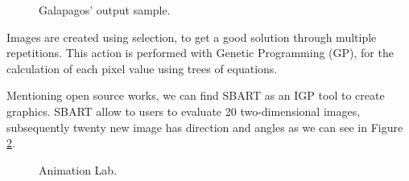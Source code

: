 \begin{figure}
\captionsetup{justification=centering,margin=2cm}
\centering
\setlength\fboxsep{0pt}
\setlength\fboxrule{0.7pt}
\caption{Galapagos' output sample.}
\label{fig:Galapagos2}
\end{figure}

Images are created using selection, to get a good solution through multiple
repetitions. This action is performed with Genetic Programming (GP), for the
calculation of each pixel value using trees of equations.

Mentioning open source works, we can find SBART as an IGP
\cite{unemi2000sbart} tool to create graphics. SBART allow to users
to evaluate 20 two-dimensional images, subsequently twenty new image has
direction and angles as we can see in Figure \ref{fig:AnimationLab}.

\begin{figure}
\captionsetup{justification=centering,margin=2cm}
\centering
\setlength\fboxsep{0pt}
\setlength\fboxrule{0.7pt}
\caption{Animation Lab.}
\label{fig:AnimationLab}
\end{figure}

